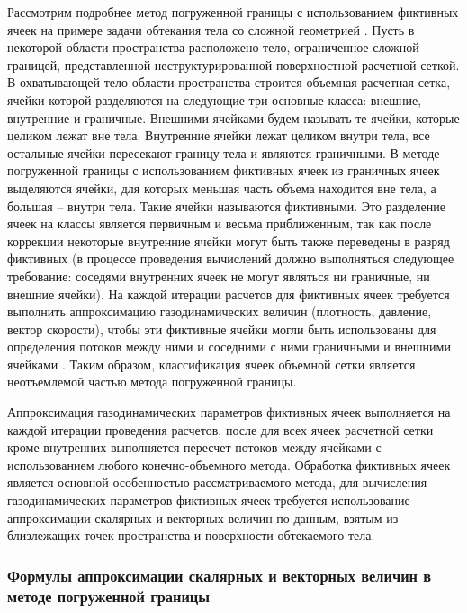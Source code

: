 Рассмотрим подробнее метод погруженной границы с использованием фиктивных ячеек \cite{Peter2016Immersed} на примере задачи обтекания тела со сложной геометрией \cite{Rybakov2020GeoIBM}.
Пусть в некоторой области пространства расположено тело, ограниченное сложной границей, представленной неструктурированной поверхностной расчетной сеткой.
В охватывающей тело области пространства строится объемная расчетная сетка, ячейки которой разделяются на следующие три основные класса: внешние\label{term:cell_ibm_outer}, внутренние\label{term:cell_ibm_inner} и граничные\label{term:cell_ibm_border}.
Внешними ячейками будем называть те ячейки, которые целиком лежат вне тела.
Внутренние ячейки лежат целиком внутри тела, все остальные ячейки пересекают границу тела и являются граничными.
В методе погруженной границы с использованием фиктивных ячеек из граничных ячеек выделяются ячейки, для которых меньшая часть объема находится вне тела, а большая -- внутри тела.
Такие ячейки называются фиктивными.
Это разделение ячеек на классы является первичным и весьма приближенным, так как после коррекции некоторые внутренние ячейки могут быть также переведены в разряд фиктивных (в процессе проведения вычислений должно выполняться следующее требование: соседями внутренних ячеек не могут являться ни граничные, ни внешние ячейки).
На каждой итерации расчетов для фиктивных ячеек требуется выполнить аппроксимацию газодинамических величин (плотность, давление, вектор скорости), чтобы эти фиктивные ячейки могли быть использованы для определения потоков между ними и соседними с ними граничными и внешними ячейками \cite{Vinnikov2007Immersed}.
Таким образом, классификация ячеек объемной сетки является неотъемлемой частью метода погруженной границы.

Аппроксимация газодинамических параметров фиктивных ячеек выполняется на каждой итерации проведения расчетов, после для всех ячеек расчетной сетки кроме внутренних выполняется пересчет потоков между ячейками с использованием любого конечно-объемного метода. Обработка фиктивных ячеек является основной особенностью рассматриваемого метода, для вычисления газодинамических параметров фиктивных ячеек требуется использование аппроксимации скалярных и векторных величин по данным, взятым из близлежащих точек пространства и поверхности обтекаемого тела.

\subsubsection{Формулы аппроксимации скалярных и векторных величин в методе погруженной границы}

